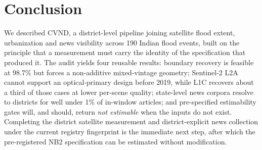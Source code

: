 \documentclass[conference]{IEEEtran}
\begin{document}
\section{Conclusion}
We described CVND, a district-level pipeline joining satellite flood extent,
urbanization and news visibility across 190 Indian flood events, built on the
principle that a measurement must carry the identity of the specification that
produced it. The audit yields four reusable results: boundary recovery is
feasible at 98.7\% but forces a non-additive mixed-vintage geometry; Sentinel-2
L2A cannot support an optical-primary design before 2019, while L1C recovers
about a third of those cases at lower per-scene quality; state-level news
corpora resolve to districts for well under 1\% of in-window articles; and
pre-specified estimability gates will, and should, return \emph{not estimable}
when the inputs do not exist. Completing the district satellite measurement and
district-explicit news collection under the current registry fingerprint is the
immediate next step, after which the pre-registered NB2 specification can be
estimated without modification.
\end{document}
